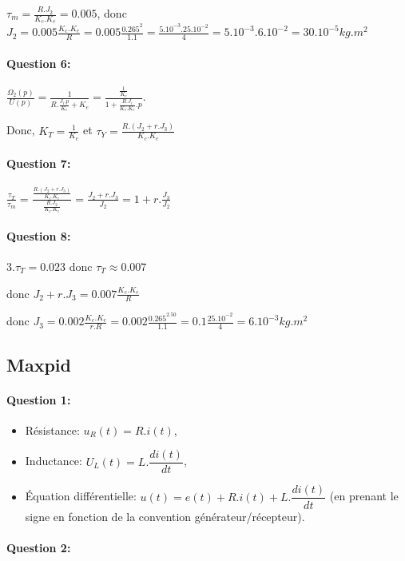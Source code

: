 $\tau_m=\frac{R.J_2}{K_c.K_e}=0.005$, donc $J_2=0.005\frac{K_c.K_e}{R}=0.005\frac{0.265^2}{1.1}=\frac{5.10^{-3}.25.10^{-2}}{4}=5.10^{-3}.6.10^{-2}=30.10^{-5}kg.m^2$ 

\paragraph{Question 6:}

$\frac{\Omega_2(p)}{U(p)}=\frac{1}{R.\frac{J_i.p}{K_c}+K_e}=\frac{\frac{1}{K_e}}{1+\frac{R.J_i}{K_c.K_e}.p}$.

Donc, $K_T=\frac{1}{K_e}$ et $\tau_Y=\frac{R.\left(J_2+r.J_3\right)}{K_c.K_e}$

\paragraph{Question 7:}

$\frac{\tau_T}{\tau_m}=\frac{\frac{R.\left(J_2+r.J_3\right)}{K_c.K_e}}{\frac{R.J_2}{K_c.K_e}}=\frac{J_2+r.J_3}{J_2}=1+r.\frac{J_3}{J_2}$

\paragraph{Question 8:}

$3.\tau_T=0.023$ donc $\tau_T\approx 0.007$

donc $J_2+r.J_3=0.007\frac{K_c.K_e}{R}$

donc $J_3=0.002\frac{K_c.K_e}{r.R}=0.002\frac{0.265^2.50}{1.1}=0.1\frac{25.10^{-2}}{4}=6.10^{-3}kg.m^2$

\subsection{Maxpid}

\paragraph{Question 1:}

\begin{itemize}
 \item Résistance: $u_R(t)=R.i(t)$,
 \item Inductance: $U_L(t)=L.\dfrac{di(t)}{dt}$,
 \item Équation différentielle: $u(t)=e(t)+R.i(t)+L.\dfrac{di(t)}{dt}$ (en prenant le signe en fonction de la convention générateur/récepteur).
\end{itemize}

\paragraph{Question 2:}

